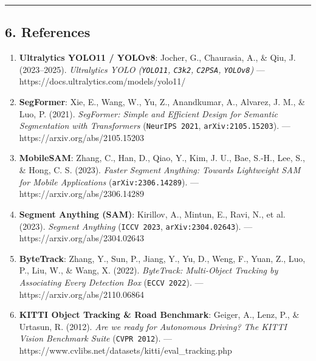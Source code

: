 \documentclass[10.5pt,a4paper]{article}
\begin{document}
\par\noindent\rule{\textwidth}{0.4pt}\par\medskip

\subsection{6. References}

\begin{enumerate}[leftmargin=1.8em,itemsep=2pt]
\item \textbf{Ultralytics YOLO11 / YOLOv8}: Jocher, G., Chaurasia, A., \& Qiu, J. (2023--2025). \textit{Ultralytics YOLO (\texttt{YOLO11}, \texttt{C3k2}, \texttt{C2PSA}, \texttt{YOLOv8})} --- https:\allowbreak{}/\allowbreak{}/\allowbreak{}docs.\allowbreak{}ultralytics.\allowbreak{}com/\allowbreak{}models/\allowbreak{}yolo11/\allowbreak{}
\item \textbf{SegFormer}: Xie, E., Wang, W., Yu, Z., Anandkumar, A., Alvarez, J. M., \& Luo, P. (2021). \textit{SegFormer: Simple and Efficient Design for Semantic Segmentation with Transformers} (\texttt{NeurIPS 2021}, \texttt{arXiv:\allowbreak{}2105.\allowbreak{}15203}).\allowbreak{} --- https:\allowbreak{}/\allowbreak{}/\allowbreak{}arxiv.\allowbreak{}org/\allowbreak{}abs/\allowbreak{}2105.\allowbreak{}15203
\item \textbf{MobileSAM}: Zhang, C., Han, D., Qiao, Y., Kim, J. U., Bae, S.-H., Lee, S., \& Hong, C. S. (2023). \textit{Faster Segment Anything: Towards Lightweight SAM for Mobile Applications} (\texttt{arXiv:\allowbreak{}2306.\allowbreak{}14289}).\allowbreak{} --- https:\allowbreak{}/\allowbreak{}/\allowbreak{}arxiv.\allowbreak{}org/\allowbreak{}abs/\allowbreak{}2306.\allowbreak{}14289
\item \textbf{Segment Anything (SAM)}: Kirillov, A., Mintun, E., Ravi, N., et al. (2023). \textit{Segment Anything} (\texttt{ICCV 2023}, \texttt{arXiv:\allowbreak{}2304.\allowbreak{}02643}).\allowbreak{} --- https:\allowbreak{}/\allowbreak{}/\allowbreak{}arxiv.\allowbreak{}org/\allowbreak{}abs/\allowbreak{}2304.\allowbreak{}02643
\item \textbf{ByteTrack}: Zhang, Y., Sun, P., Jiang, Y., Yu, D., Weng, F., Yuan, Z., Luo, P., Liu, W., \& Wang, X. (2022). \textit{ByteTrack: Multi-Object Tracking by Associating Every Detection Box} (\texttt{ECCV 2022}).\allowbreak{} --- https:\allowbreak{}/\allowbreak{}/\allowbreak{}arxiv.\allowbreak{}org/\allowbreak{}abs/\allowbreak{}2110.\allowbreak{}06864
\item \textbf{KITTI Object Tracking \& Road Benchmark}: Geiger, A., Lenz, P., \& Urtasun, R. (2012). \textit{Are we ready for Autonomous Driving? The KITTI Vision Benchmark Suite} (\texttt{CVPR 2012}).\allowbreak{} --- https:\allowbreak{}/\allowbreak{}/\allowbreak{}www.\allowbreak{}cvlibs.\allowbreak{}net/\allowbreak{}datasets/\allowbreak{}kitti/\allowbreak{}eval\_\allowbreak{}tracking.\allowbreak{}php

\end{enumerate}
\end{document}
